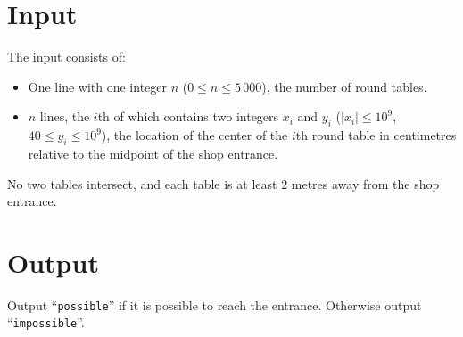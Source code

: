 \section*{Input}
The input consists of:
\begin{itemize}
    \item One line with one integer $n$ ($0 \le n \le 5\,000$), the number of round tables.
    \item $n$ lines, the $i$th of which contains two integers $x_i$ and $y_i$
    ($|x_i| \le 10^9$, $40 \le y_i \le 10^9$), the location of the
    center of the $i$th round table in centimetres relative to the midpoint of
    the shop entrance.
\end{itemize}

No two tables intersect, and each table is at least $2$ metres away from the
shop entrance.

\section*{Output}
Output ``\texttt{possible}'' if it is possible to reach the entrance. Otherwise
output ``\texttt{impossible}''.

